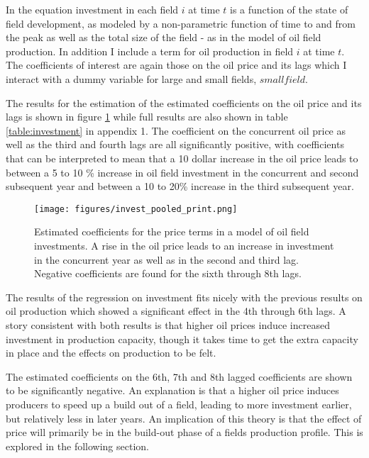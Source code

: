 \documentclass[12pt]{article}
\begin{document}
In the equation investment in each field $i$ at time $t$ is a function of the state of field development, as modeled by a non-parametric function of time to and from the peak as well as the total size of the field - as in the model of oil field production.  In addition I include a term for oil production in field $i$ at time $t$.  The coefficients of interest are again those on the oil price and its lags which I interact with a dummy variable for large and small fields, $smallfield$.

The results for the estimation of the estimated coefficients on the oil price and its lags is shown in figure \ref{gam_price_invest_box} while full results are also shown in table \ref{table:investment} in appendix 1.  The coefficient on the concurrent oil price as well as the third and fourth lags are all significantly positive, with coefficients that can be interpreted to mean that a 10 dollar increase in the oil price leads to between a 5 to 10 \% increase in oil field investment in the concurrent and second subsequent year and between a 10 to 20\% increase in the third subsequent year.  

\begin{figure}
	\texttt{[image: figures/invest\_pooled\_print.png]}
	\caption{Estimated coefficients for the price terms in a model of oil field investments.  A rise in the oil price leads to an increase in investment in the concurrent year as well as in the second and third lag. Negative coefficients are found for the sixth through 8th lags.}
	\label{gam_price_invest_box}
\end{figure}

The results of the regression on investment fits nicely with the previous results on oil production which showed a significant effect in the 4th through 6th lags.  A story consistent with both results is that higher oil prices induce increased investment in production capacity, though it takes time to get the extra capacity in place and the effects on production to be felt.

The estimated coefficients on the 6th, 7th and 8th lagged coefficients are shown to be significantly negative. An explanation is that a higher oil price induces producers to speed up a build out of a field, leading to more investment earlier, but relatively less in later years.  An implication of this theory is that the effect of price will primarily be in the build-out phase of a fields production profile.  This is explored in the following section.
\end{document}
